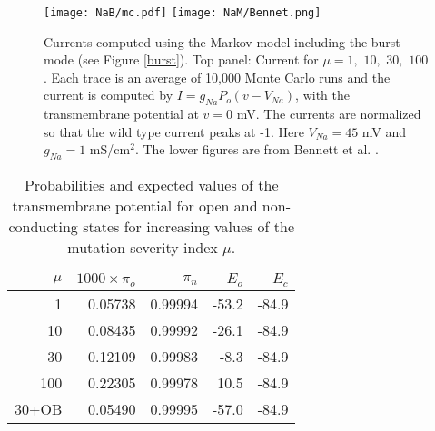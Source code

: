 

\begin{figure}[p]\centering
\vbox{
\texttt{[image: NaB/mc.pdf]}
\texttt{[image: NaM/Bennet.png]}
}
\caption{Currents computed using the Markov model including the burst mode (see Figure \ref{burst}). Top panel: Current for $\mu=1,$ $10,$ $30,$ $100$. Each trace is an average of 10,000 Monte Carlo runs and the current is computed by  $I=g_{Na} P_o (v-V_{Na})$, with the transmembrane potential at $v=0$ mV. The currents are normalized so that the wild type current peaks at -1. Here $V_{Na} = 45$ mV and $g_{Na} = 1$ mS/$\mbox{cm}^2$.  The lower figures are from Bennett et al. \cite{Bennett1995}.\label{NaB/mc.pdf}}
\end{figure}


\begin{table}  \begin{center}
\begin{tabular}{|r|r|r|r|r|} \hline
$\mu$ & $1000 \times \pi_o$ & $\pi_n$ & $E_o$ & $E_c$ \\ \hline
1 & 0.05738 &  0.99994 & -53.2 & -84.9 \\ \hline
10 & 0.08435 & 0.99992 & -26.1 & -84.9 \\ \hline
30 & 0.12109 & 0.99983 & -8.3 & -84.9 \\ \hline
100 & 0.22305 & 0.99978 & 10.5 & -84.9 \\ \hline
30+OB & 0.05490&0.99995 & -57.0 & -84.9 \\ \hline
\end{tabular} \end{center}
\caption{Probabilities and expected values of the transmembrane potential for open and non-conducting states for increasing values of the mutation severity index $\mu$.} \label{tab:burst}
\end{table}


